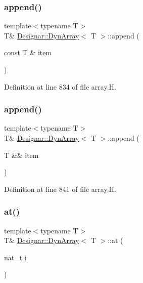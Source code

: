 \subsubsection{\texorpdfstring{append()}{append()}\hspace{0.1cm}{\footnotesize\ttfamily [1/2]}}
{\footnotesize\ttfamily template$<$typename T$>$ \\
T\& \hyperlink{class_designar_1_1_dyn_array}{Designar\+::\+Dyn\+Array}$<$ T $>$\+::append (\begin{DoxyParamCaption}\item[{const T \&}]{item }\end{DoxyParamCaption})\hspace{0.3cm}{\ttfamily [inline]}}



Definition at line 834 of file array.\+H.

\mbox{\label{class_designar_1_1_dyn_array_a0e1583bf9d554b5553438dffd57bff93}} 
\subsubsection{\texorpdfstring{append()}{append()}\hspace{0.1cm}{\footnotesize\ttfamily [2/2]}}
{\footnotesize\ttfamily template$<$typename T$>$ \\
T\& \hyperlink{class_designar_1_1_dyn_array}{Designar\+::\+Dyn\+Array}$<$ T $>$\+::append (\begin{DoxyParamCaption}\item[{T \&\&}]{item }\end{DoxyParamCaption})\hspace{0.3cm}{\ttfamily [inline]}}



Definition at line 841 of file array.\+H.

\mbox{\label{class_designar_1_1_dyn_array_a117ba8cd3a9275b36d713a0ef3aef0e3}} 
\subsubsection{\texorpdfstring{at()}{at()}\hspace{0.1cm}{\footnotesize\ttfamily [1/2]}}
{\footnotesize\ttfamily template$<$typename T$>$ \\
T\& \hyperlink{class_designar_1_1_dyn_array}{Designar\+::\+Dyn\+Array}$<$ T $>$\+::at (\begin{DoxyParamCaption}\item[{\hyperlink{namespace_designar_aa72662848b9f4815e7bf31a7cf3e33d1}{nat\+\_\+t}}]{i }\end{DoxyParamCaption})\hspace{0.3cm}{\ttfamily [inline]}}



